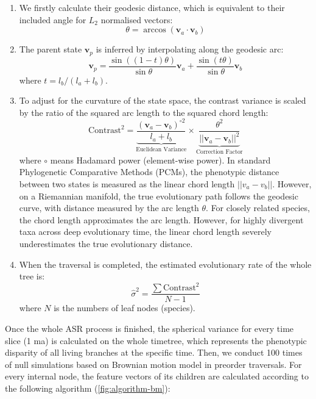\begin{enumerate}
    \item We firstly calculate their geodesic distance, which is equivalent to their included angle
            for $L_2$ normalised vectors:
    \begin{equation}
        \theta = \arccos{(\mathbf{v}_a\cdot\mathbf{v}_b)}
    \end{equation}

    \item The parent state $\mathbf{v}_p$ is inferred by interpolating along the geodesic arc:
    \begin{equation}
        \mathbf{v}_p = \frac{\sin((1-t)\theta)}{\sin\theta}\mathbf{v}_a + \frac{\sin(t\theta)}{\sin\theta}\mathbf{v}_b
    \end{equation}
    where $t = l_b / (l_a + l_b)$.

    \item To adjust for the curvature of the state space, the contrast variance is scaled by the ratio of the squared arc length to the squared chord length:
    \begin{equation}
        \text{Contrast}^2 = \underbrace{\frac{(\mathbf{v}_a - \mathbf{v}_b)^{\circ 2}}{l_a + l_b}}_{\text{Euclidean Variance}} \times \underbrace{\frac{\theta^2}{||\mathbf{v}_a - \mathbf{v}_b||^2}}_{\text{Correction Factor}}
    \end{equation}
    where $\circ$ means Hadamard power (element-wise power). In standard Phylogenetic Comparative Methods (PCMs), the phenotypic distance between two states is measured as the linear chord length $||v_a - v_b||$. However, on a Riemannian manifold, the true evolutionary path follows the geodesic curve, with distance measured by the arc length $\theta$. For closely related species, the chord length approximates the arc length. However, for highly divergent taxa across deep evolutionary time, the linear chord length severely underestimates the true evolutionary distance. 

    \item When the traversal is completed, the estimated evolutionary rate of the whole tree is:
    \begin{equation}
        \hat{\sigma}^2 = \frac{\sum\text{Contrast}^2}{N-1}
    \end{equation}
    where $N$ is the numbers of leaf nodes (species).
\end{enumerate}

Once the whole ASR process is finished, the spherical variance for every time slice (1 ma) is calculated
on the whole timetree, which represents the phenotypic disparity of all living branches at the specific time.
Then, we conduct 100 times of null simulations based on Brownian motion model in preorder traversals.
For every internal node, the feature vectors of its children are calculated
according to the following algorithm (\cref{fig:algorithm-bm}):

